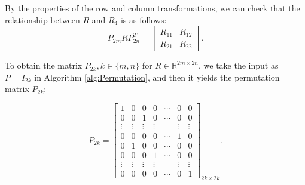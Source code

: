 \documentclass[conference]{IEEEtran}
\numberwithin{equation}{section}
\begin{document}
 \fi

By the properties of the row and column transformations, we can check that the relationship between $R$ and $R_4$ is as follows:
\begin{equation}\label{eq:Rn}
    P_{2m} R P_{2n}^T = \begin{bmatrix} R_{11} & R_{12}\\R_{21}& R_{22}\end{bmatrix}.
\end{equation}

To obtain the matrix $P_{2k}, k\in \{m,n\}$ for $R \in \mathbb{R}^{2m \times 2n}$, we take the input as $P=I_{2k}$ in Algorithm \cref{alg:Permutation}, and then it yields the permutation matrix $P_{2k}$:

\begin{equation}\label{p}
    P_{2k} = \begin{bmatrix} 
            1 & 0 & 0 & 0 & \cdots & 0 & 0\\ 
            0 & 0 & 1 & 0 & \cdots & 0 & 0\\ 
            \vdots & \vdots & \vdots & \vdots &  & \vdots & \vdots\\ 
            0 & 0 & 0 & 0 & \cdots & 1 & 0 \\
            0 & 1 & 0 & 0 & \cdots & 0 & 0\\ 
            0 & 0 & 0 & 1 & \cdots & 0 & 0\\ 
            \vdots & \vdots & \vdots & \vdots &  & \vdots & \vdots\\ 
            0 & 0 & 0 & 0 &\cdots & 0 & 1 
        \end{bmatrix}_{2k \times 2k}.
\end{equation}
\end{document}
